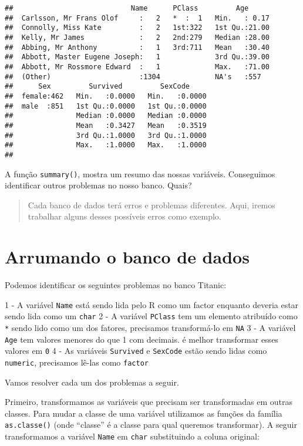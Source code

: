 \documentclass[]{book}
\theoremstyle{definition}
\theoremstyle{definition}
\theoremstyle{definition}
\theoremstyle{remark}
\begin{document}
\begin{verbatim}
##                            Name      PClass         Age       
##  Carlsson, Mr Frans Olof     :   2   *  :  1   Min.   : 0.17  
##  Connolly, Miss Kate         :   2   1st:322   1st Qu.:21.00  
##  Kelly, Mr James             :   2   2nd:279   Median :28.00  
##  Abbing, Mr Anthony          :   1   3rd:711   Mean   :30.40  
##  Abbott, Master Eugene Joseph:   1             3rd Qu.:39.00  
##  Abbott, Mr Rossmore Edward  :   1             Max.   :71.00  
##  (Other)                     :1304             NA's   :557    
##      Sex         Survived         SexCode      
##  female:462   Min.   :0.0000   Min.   :0.0000  
##  male  :851   1st Qu.:0.0000   1st Qu.:0.0000  
##               Median :0.0000   Median :0.0000  
##               Mean   :0.3427   Mean   :0.3519  
##               3rd Qu.:1.0000   3rd Qu.:1.0000  
##               Max.   :1.0000   Max.   :1.0000  
## 
\end{verbatim}

A função \texttt{summary()}, mostra um resumo das nossas variáveis. Conseguimos identificar outros problemas no nosso banco. Quais?

\begin{quote}
Cada banco de dados terá erros e problemas diferentes. Aqui, iremos trabalhar alguns desses possíveis erros como exemplo.
\end{quote}

\hypertarget{arrumando-o-banco-de-dados}{%
\section{Arrumando o banco de dados}\label{arrumando-o-banco-de-dados}}

Podemos identificar os seguintes problemas no banco Titanic:

1 - A variável \texttt{Name} está sendo lida pelo R como um factor enquanto deveria estar sendo lida como um \texttt{char}
2 - A variável \texttt{PClass} tem um elemento atribuído como \texttt{*} sendo lido como um dos fatores, precisamos transformá-lo em \texttt{NA}
3 - A variável \texttt{Age} tem valores menores do que 1 com decimais. é melhor transformar esses valores em \texttt{0}
4 - As variáveis \texttt{Survived} e \texttt{SexCode} estão sendo lidas como \texttt{numeric}, precisamos lê-las como \texttt{factor}

Vamos resolver cada um dos problemas a seguir.

Primeiro, transformamos as variáveis que precisam ser transformadas em outras classes. Para mudar a classe de uma variável utilizamos as funções da família \texttt{as.classe()} (onde ``classe'' é a classe para qual queremos transformar). A seguir transformamos a variável \texttt{Name} em \texttt{char} substituindo a coluna original:
\end{document}

